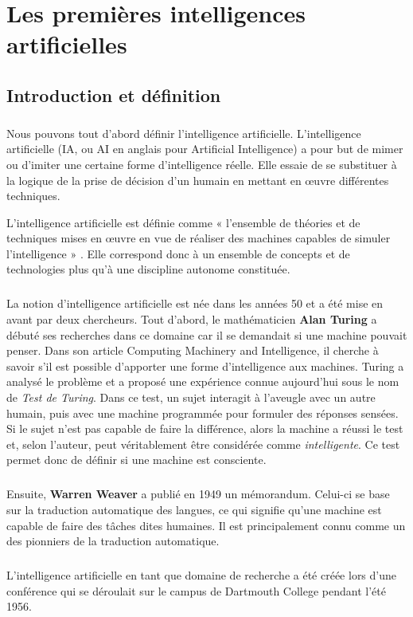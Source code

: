 \section{Les premières intelligences artificielles}
\subsection{Introduction et définition}

\subparagraph{}
Nous pouvons tout d’abord définir l’intelligence artificielle.
L'intelligence artificielle (IA, ou AI en anglais pour Artificial Intelligence) a pour but de mimer ou d’imiter une certaine forme d’intelligence réelle. Elle essaie de se substituer à la logique de la prise de décision d’un humain en mettant en œuvre différentes techniques.

L'intelligence artificielle est définie comme « l'ensemble de théories et de techniques mises en œuvre en vue de réaliser des machines capables de simuler l'intelligence » . 
Elle correspond donc à un ensemble de concepts et de technologies plus qu'à une discipline autonome constituée.

\subparagraph{}
La notion d’intelligence artificielle est née dans les années 50 et a été mise en avant par deux chercheurs.
Tout d’abord, le mathématicien \textbf{Alan Turing} a débuté ses recherches dans ce domaine car il se demandait si une machine pouvait penser.
Dans son article Computing Machinery and Intelligence, il cherche à savoir s’il est possible d’apporter une forme d'intelligence aux machines.
Turing a analysé le problème et a proposé une expérience connue aujourd’hui sous le nom de \textit{Test de Turing}. 
Dans ce test, un sujet interagit à l'aveugle avec un autre humain, puis avec une machine programmée pour formuler des réponses sensées. Si le sujet n'est pas capable de faire la différence, alors la machine a réussi le test et, selon l'auteur, peut véritablement être considérée comme \textit{intelligente}.
Ce test permet donc de définir si une machine est consciente.

\subparagraph{}
Ensuite, \textbf{Warren Weaver} a publié en 1949 un mémorandum. Celui-ci se base sur la traduction automatique des langues, ce qui signifie qu’une machine est capable de faire des tâches dites humaines.
Il est principalement connu comme un des pionniers de la traduction automatique.

\subparagraph{}
L’intelligence artificielle en tant que domaine de recherche a été créée lors d’une conférence qui se déroulait sur le campus de Dartmouth College pendant l'été 1956.

